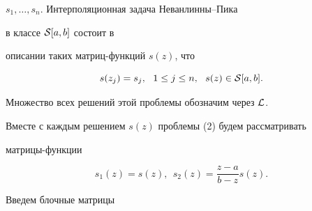 $s_1, \dotsc,s_n$. Интерполяционная задача Не\-ван\-лин\-ны--Пика 


в классе ${\cal S}[a,b]$ состоит в


описании таких матриц-функций $s(z)$, что


\begin{equation}


s(z_j)=s_j, \ \ 1 \leq j \leq n, \ \ s(z) \in {\cal S}[a,b].


\end{equation}


Множество всех решений этой проблемы обозначим через ${\cal L}$.





Вместе с каждым решением $s(z)$ проблемы (2) будем рассматривать


матрицы-функции


\begin{equation}


s_1(z)=s(z), \ \ s_2(z)=\frac{z-a}{b-z}s(z).


\end{equation}


Введем блочные матрицы



